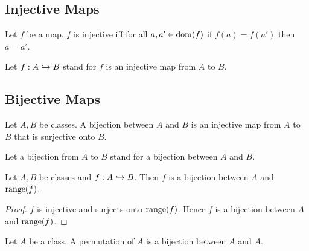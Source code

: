 \documentclass[10pt]{article}
\begin{document}
  \subsection*{Injective Maps}

  \begin{forthel}
    \begin{definition}
      Let $f$ be a map.
      $f$ is injective iff for all $a, a' \in \operatorname{dom}(f)$ if $f(a) = f(a')$ then $a = a'$.
    \end{definition}

    Let $f: A \hookrightarrow B$ stand for $f$ is an injective map from $A$ to $B$.
  \end{forthel}


  \subsection*{Bijective Maps}

  \begin{forthel}
    \begin{definition}
      Let $A, B$ be classes.
      A bijection between $A$ and $B$ is an injective map from $A$ to $B$ that is surjective onto $B$.
    \end{definition}

    Let a bijection from $A$ to $B$ stand for a bijection between $A$ and $B$.
  \end{forthel}

  \begin{forthel}
    \begin{proposition}
      Let $A, B$ be classes and $f : A \hookrightarrow B$.
      Then $f$ is a bijection between $A$ and $\textrm{range}(f)$.
    \end{proposition}
    \begin{proof}
      $f$ is injective and surjects onto $\textrm{range}(f)$.
      Hence $f$ is a bijection between $A$ and $\textrm{range}(f)$.
    \end{proof}
  \end{forthel}

  \begin{forthel}
    \begin{definition}
      Let $A$ be a class.
      A permutation of $A$ is a bijection between $A$ and $A$.
    \end{definition}
  \end{forthel}
\end{document}
